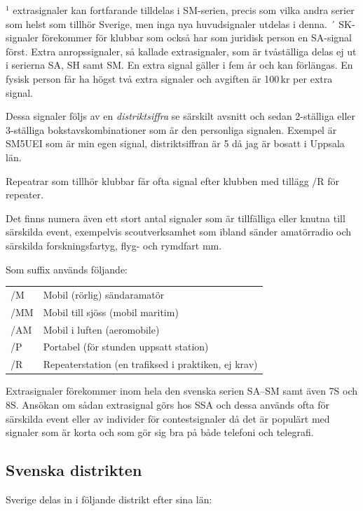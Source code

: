 $^1$ extrasignaler kan fortfarande tilldelas i SM-serien, precis som vilka andra
serier som helst som tillhör Sverige, men inga nya huvudsignaler utdelas i denna.
´
SK-signaler förekommer för klubbar som också har som juridisk person en SA-signal
först. Extra anropssignaler, så kallade extrasignaler, som är tvåställiga delas
ej ut i serierna SA, SH samt SM. En extra signal gäller i fem år och kan förlängas.
En fysisk person får ha högst två extra signaler och avgiften är 100\,kr per
extra signal.

Dessa signaler följs av en \textit{distriktsiffra} se särskilt avsnitt och
sedan 2-ställiga eller 3-ställiga bokstavskombinationer som är den personliga
signalen. Exempel är SM5UEI som är min egen signal, distriktsiffran är 5 då
jag är bosatt i Uppsala län.

Repeatrar som tillhör klubbar får ofta signal efter klubben med tillägg /R för
repeater.

Det finns numera även ett stort antal signaler som är tillfälliga eller knutna
till särskilda event, exempelvis scoutverksamhet som ibland sänder amatörradio
och särskilda forskningsfartyg, flyg- och rymdfart mm.

Som suffix används följande:

\begin{tabular}{ll}
	/M  & Mobil (rörlig) sändaramatör                \\
	/MM & Mobil till sjöss (mobil maritim)           \\
	/AM & Mobil i luften (aeromobile)                \\
	/P  & Portabel (för stunden uppsatt station)     \\
	/R  & Repeaterstation (en trafiksed i praktiken, ej krav) \\
\end{tabular}

Extrasignaler förekommer inom hela den svenska serien SA--SM samt
även 7S och 8S. Ansökan om sådan extrasignal görs hos SSA och dessa
används ofta för särskilda event eller av individer för
contestsignaler då det är populärt med signaler som är korta och som
gör sig bra på både telefoni och telegrafi.

\subsection{Svenska distrikten}

Sverige delas in i följande distrikt efter sina län:



